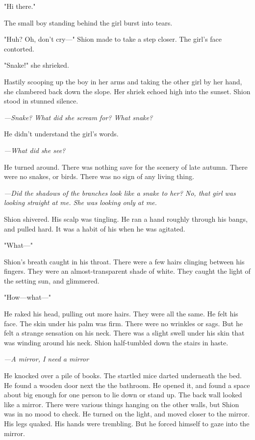 "Hi there."

The small boy standing behind the girl burst into tears.

"Huh? Oh, don't cry---" Shion made to take a step closer. The girl's face
contorted.

"Snake!" she shrieked.

Hastily scooping up the boy in her arms and taking the other girl by her
hand, she clambered back down the slope. Her shriek echoed high into the
sunset. Shion stood in stunned silence.

\emph{---Snake? What did she scream for? What snake?}

He didn't understand the girl's words.

\emph{---What did she see?}

He turned around. There was nothing save for the scenery of late autumn.
There were no snakes, or birds. There was no sign of any living thing.

\emph{---Did the shadows of the branches look like a snake to her? \el No, that
girl was looking straight at me. She was looking only at me.}

Shion shivered. His scalp was tingling. He ran a hand roughly through
his bangs, and pulled hard. It was a habit of his when he was agitated.

"What---"

Shion's breath caught in his throat. There were a few hairs clinging
between his fingers. They were an almost-transparent shade of white.
They caught the light of the setting sun, and glimmered.

"How---what---"

He raked his head, pulling out more hairs. They were all the same. He
felt his face. The skin under his palm was firm. There were no wrinkles
or sags. But he felt a strange sensation on his neck. There was a slight
swell under his skin that was winding around his neck. Shion
half-tumbled down the stairs in haste.

\emph{---A mirror, I need a mirror\el }

He knocked over a pile of books. The startled mice darted underneath the
bed. He found a wooden door next the the bathroom. He opened it, and
found a space about big enough for one person to lie down or stand up.
The back wall looked like a mirror. There were various things hanging on
the other walls, but Shion was in no mood to check. He turned on the
light, and moved closer to the mirror. His legs quaked. His hands were
trembling. But he forced himself to gaze into the mirror.

